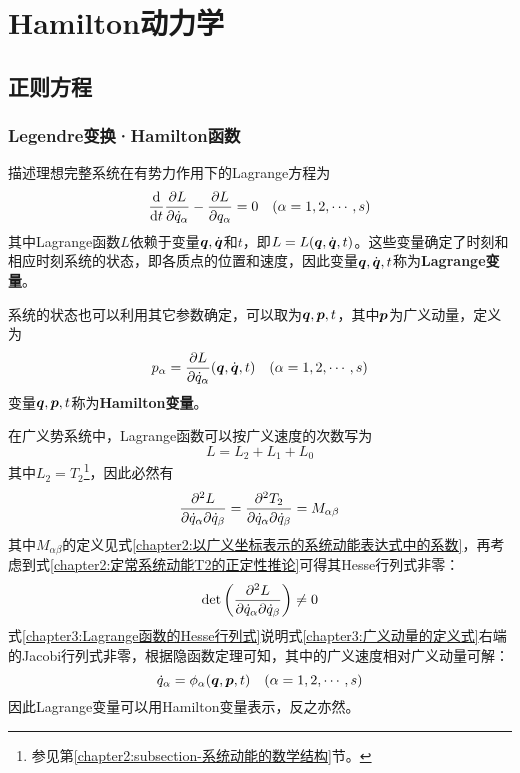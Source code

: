 \chapter{Hamilton动力学}

\section{正则方程}

\subsection{Legendre变换·Hamilton函数}

描述理想完整系统在有势力作用下的Lagrange方程为
\begin{equation}
	\frac{\mathrm{d}}{\mathrm{d} t} \frac{\partial L}{\partial \dot{q}_\alpha} - \frac{\partial L}{\partial q_\alpha} = 0 \quad (\alpha = 1,2,\cdots,s)
	\label{chapter3:Lagrange方程-重写}
\end{equation}
其中Lagrange函数$L$依赖于变量$\boldsymbol{q},\dot{\boldsymbol{q}}$和$t$，即$L = L(\boldsymbol{q},\dot{\boldsymbol{q}},t)$。这些变量确定了时刻和相应时刻系统的状态，即各质点的位置和速度，因此变量$\boldsymbol{q},\dot{\boldsymbol{q}},t$称为{\bf Lagrange变量}。

系统的状态也可以利用其它参数确定，可以取为$\boldsymbol{q},\boldsymbol{p},t$，其中$\boldsymbol{p}$为广义动量，定义为
\begin{equation}
	p_\alpha = \frac{\partial L}{\partial \dot{q}_\alpha}(\boldsymbol{q},\dot{\boldsymbol{q}},t)\quad (\alpha=1,2,\cdots,s)
	\label{chapter3:广义动量的定义式}
\end{equation}
变量$\boldsymbol{q},\boldsymbol{p},t$称为{\bf Hamilton变量}。

在广义势系统中，Lagrange函数可以按广义速度的次数写为
\begin{equation*}
	L = L_2+L_1+L_0
\end{equation*}
其中$L_2=T_2$\footnote{参见第\ref{chapter2:subsection-系统动能的数学结构}节。}，因此必然有
\begin{equation}
	\frac{\partial^2 L}{\partial \dot{q}_\alpha\partial \dot{q}_\beta} = \frac{\partial^2 T_2}{\partial \dot{q}_\alpha\partial \dot{q}_\beta} = M_{\alpha\beta}
\end{equation}
其中$M_{\alpha\beta}$的定义见式\eqref{chapter2:以广义坐标表示的系统动能表达式中的系数}，再考虑到式\eqref{chapter2:定常系统动能T2的正定性推论}可得其Hesse行列式非零：
\begin{equation}
	\det\begin{pmatrix} \dfrac{\partial^2 L}{\partial \dot{q}_\alpha\partial \dot{q}_\beta} \end{pmatrix} \neq 0
	\label{chapter3:Lagrange函数的Hesse行列式}
\end{equation}
式\eqref{chapter3:Lagrange函数的Hesse行列式}说明式\eqref{chapter3:广义动量的定义式}右端的Jacobi行列式非零，根据隐函数定理可知，其中的广义速度相对广义动量可解：
\begin{equation}
	\dot{q}_\alpha = \phi_\alpha(\boldsymbol{q},\boldsymbol{p},t)\quad (\alpha=1,2,\cdots,s)
\end{equation}
因此Lagrange变量可以用Hamilton变量表示，反之亦然。


